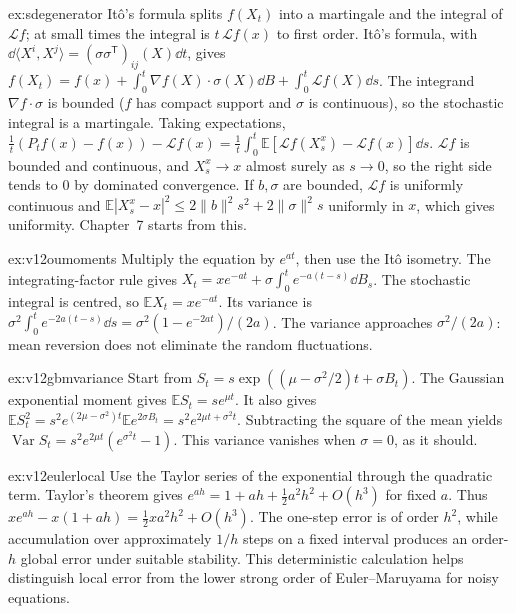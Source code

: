 \begin{solution}{ex:sdegenerator}
\idea It\^o's formula splits $f(X_t)$ into a martingale and the integral of $\mathcal Lf$; at small times the integral is $t\,\mathcal Lf(x)$ to first order.
\writeup It\^o's formula, with $\dd\langle X^i,X^j\rangle=(\sigma\sigma^{\mathsf T})_{ij}(X)\dd t$, gives $f(X_t)=f(x)+\int_0^t\nabla f(X)\cdot\sigma(X)\dd B+\int_0^t\mathcal Lf(X)\dd s$. The integrand $\nabla f\cdot\sigma$ is bounded
($f$ has compact support and $\sigma$ is continuous), so the stochastic integral is a martingale. Taking expectations, $\frac1t(P_tf(x)-f(x))-\mathcal Lf(x)=\frac1t\int_0^t\mathbb E[\mathcal Lf(X^x_s)-\mathcal Lf(x)]\dd s$. $\mathcal Lf$ is
bounded and continuous, and $X^x_s\to x$ almost surely as $s\to0$, so the right side tends to $0$ by dominated convergence. If $b,\sigma$ are bounded, $\mathcal Lf$ is uniformly continuous and
$\mathbb E|X^x_s-x|^2\le2\|b\|^2s^2+2\|\sigma\|^2s$ uniformly in $x$, which gives uniformity. Chapter~7 starts from this.
\end{solution}

\begin{solution}{ex:v12oumoments}
\idea Multiply the equation by $e^{at}$, then use the Itô isometry.
\writeup The integrating-factor rule gives $X_t=xe^{-at}+\sigma\int_0^te^{-a(t-s)}\dd B_s$. The stochastic integral is centred, so $\mathbb EX_t=xe^{-at}$. Its variance is $\sigma^2\int_0^te^{-2a(t-s)}\dd s=\sigma^2(1-e^{-2at})/(2a)$. The variance approaches $\sigma^2/(2a)$: mean reversion does not eliminate the random fluctuations.
\end{solution}

\begin{solution}{ex:v12gbmvariance}
\idea Start from $S_t=s\exp((\mu-\sigma^2/2)t+\sigma B_t)$.
\writeup The Gaussian exponential moment gives $\mathbb ES_t=se^{\mu t}$. It also gives $\mathbb ES_t^2=s^2e^{(2\mu-\sigma^2)t}\mathbb Ee^{2\sigma B_t}=s^2e^{2\mu t+\sigma^2t}$. Subtracting the square of the mean yields $\operatorname{Var}S_t=s^2e^{2\mu t}(e^{\sigma^2t}-1)$. This variance vanishes when $\sigma=0$, as it should.
\end{solution}

\begin{solution}{ex:v12eulerlocal}
\idea Use the Taylor series of the exponential through the quadratic term.
\writeup Taylor's theorem gives $e^{ah}=1+ah+\frac12a^2h^2+O(h^3)$ for fixed $a$. Thus $xe^{ah}-x(1+ah)=\frac12xa^2h^2+O(h^3)$. The one-step error is of order $h^2$, while accumulation over approximately $1/h$ steps on a fixed interval produces an order-$h$ global error under suitable stability. This deterministic calculation helps distinguish local error from the lower strong order of Euler--Maruyama for noisy equations.
\end{solution}

